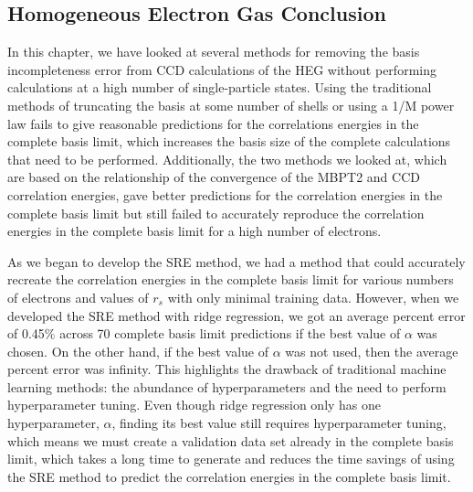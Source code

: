\subsection{Homogeneous Electron Gas Conclusion}
In this chapter, we have looked at several methods for removing the basis incompleteness error from CCD calculations of the HEG without performing calculations at a high number of single-particle states. Using the traditional methods of truncating the basis at some number of shells or using a 1/M power law fails to give reasonable predictions for the correlations energies in the complete basis limit, which increases the basis size of the complete calculations that need to be performed. Additionally, the two methods we looked at, which are based on the relationship of the convergence of the MBPT2 and CCD correlation energies, gave better predictions for the correlation energies in the complete basis limit but still failed to accurately reproduce the correlation energies in the complete basis limit for a high number of electrons.

As we began to develop the SRE method, we had a method that could accurately recreate the correlation energies in the complete basis limit for various numbers of electrons and values of $r_s$ with only minimal training data. However, when we developed the SRE method with ridge regression, we got an average percent error of 0.45$\%$ across 70 complete basis limit predictions if the best value of $\alpha$ was chosen. On the other hand, if the best value of $\alpha$ was not used, then the average percent error was infinity. This highlights the drawback of traditional machine learning methods: the abundance of hyperparameters and the need to perform hyperparameter tuning. Even though ridge regression only has one hyperparameter, $\alpha$, finding its best value still requires hyperparameter tuning, which means we must create a validation data set already in the complete basis limit, which takes a long time to generate and reduces the time savings of using the SRE method to predict the correlation energies in the complete basis limit.

